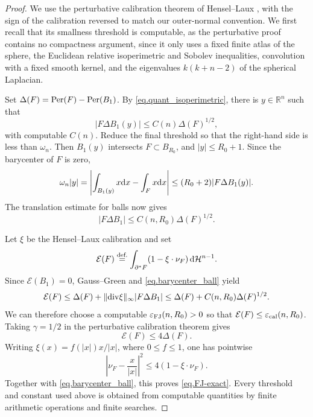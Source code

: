 \documentclass[11pt]{amsart}
\theoremstyle{plain}
\theoremstyle{definition}
\newcommand{\dHn}{\,\dd\mathcal{H}^{n-1}}
\newcommand{\eqdef}{\overset{\text{def.}}{=}}
\def\dd{{\rm d}}
\def\ddiv{{\mathop{\rm div}}}
\newcommand\Per{\mathop{\rm Per}}
\begin{document}
\begin{proof}
We use the perturbative calibration theorem of Hensel--Laux
\cite[Theorem~2]{hensel2026quantitative}, with the sign of the calibration
reversed to match our outer-normal convention. We first recall that its
smallness threshold is computable, as the perturbative proof contains no
compactness argument, since it only uses a fixed finite atlas of the sphere, the Euclidean relative isoperimetric and Sobolev inequalities, convolution with a fixed smooth kernel, and the eigenvalues $k(k+n-2)$ of the spherical
Laplacian. 

Set $\Delta(F)=\Per(F)-\Per(B_1)$. By
\eqref{eq.quant_isoperimetric}, there is $y\in\mathbb R^n$  such that
  \[
 |F\Delta B_1(y)|\le C(n)\Delta(F)^{1/2},
\]
  with computable $C(n)$. Reduce the final threshold so that the right-hand side
is less than $\omega_n$. Then $B_1(y)$ intersects $F\subset B_{R_0}$, and
$|y|\le R_0+1$. Since the barycenter of $F$ is zero,
\[
 \omega_n|y|
 =\left|\int_{B_1(y)}x\dd x-\int_Fx\dd x\right|
 \le (R_0+2)|F\Delta B_1(y)|.
\]
The translation estimate for balls now gives
\begin{equation}\label{eq.barycenter_ball}
 |F\Delta B_1|\le C(n,R_0)\Delta(F)^{1/2}.
\end{equation}


  Let $\xi$ be  the   Hensel--Laux calibration and set
\[
 \mathcal E(F)\eqdef\int_{\partial^*F}(1-\xi\cdot\nu_F)\dHn.
\]
Since $\mathcal E(B_1)=0$, Gauss--Green and
\eqref{eq.barycenter_ball} yield
\[
 \mathcal E(F)
 \le\Delta(F)+\|\ddiv\xi\|_\infty|F\Delta B_1|
 \le\Delta(F)+C(n,R_0)\Delta(F)^{1/2}.
\]
We can therefore choose a computable
$\varepsilon_{\rm FJ}(n,R_0)>0$ so that
$\mathcal E(F)\le\varepsilon_{\rm cal}(n,R_0)$. Taking $\gamma=1/2$ in the
perturbative calibration theorem gives
\[
 \mathcal E(F)\le4\Delta(F).
\]
Writing $\xi(x)=f(|x|)x/|x|$, where $0\le f\le1$, one has pointwise
\[
 \left|\nu_F-\frac{x}{|x|}\right|^2
 \le4(1-\xi\cdot\nu_F).
\]
Together with \eqref{eq.barycenter_ball}, this proves
\eqref{eq.FJ-exact}. Every threshold and constant used above is obtained from
computable quantities by finite arithmetic operations and finite searches.
\end{proof}
\end{document}
